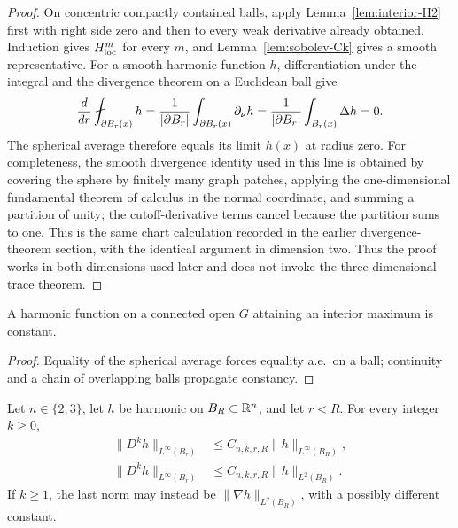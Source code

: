 \begin{proof}
On concentric compactly contained balls, apply
Lemma~\ref{lem:interior-H2} first with right side zero and then to every weak
derivative already obtained.  Induction gives $H^m_{\rm loc}$ for every
$m$, and Lemma~\ref{lem:sobolev-Ck} gives a smooth representative.  For a
smooth harmonic function $h$, differentiation under the integral and the
divergence theorem on a Euclidean ball give
\[
 \frac d{dr}\avg_{\partial B_r(x)}h
 =\frac1{|\partial B_r|}\int_{\partial B_r(x)}\partial_\nu h
 =\frac1{|\partial B_r|}\int_{B_r(x)}\Delta h=0.
\]
The spherical average therefore equals its limit $h(x)$ at radius zero.
For completeness, the smooth divergence identity used in this line is
obtained by covering the sphere by finitely many graph patches, applying the
one-dimensional fundamental theorem of calculus in the normal coordinate,
and summing a partition of unity; the cutoff-derivative terms cancel because
the partition sums to one.  This is the same chart calculation recorded in
the earlier divergence-theorem section, with the identical argument in
dimension two.  Thus the proof works in both dimensions used later and does
not invoke the three-dimensional trace theorem.
\end{proof}

\begin{proposition}\label{prop:strong-max}
A harmonic function on a connected open $G$ attaining an interior maximum is
constant.
\end{proposition}

\begin{proof}
Equality of the spherical average forces equality a.e.\ on a ball;
continuity and a chain of overlapping balls propagate constancy.
\end{proof}

\begin{lemma}\label{lem:harmonic-deriv}
Let $n\in\{2,3\}$, let $h$ be harmonic on $B_R\subset\mathbb R^n$, and let $r<R$.
For every integer $k\ge0$,
\begin{equation}\label{eq:harmonic-deriv}
\begin{aligned}
  \|D^kh\|_{L^\infty(B_r)}
  &\le C_{n,k,r,R}\|h\|_{L^\infty(B_R)},\\
  \|D^kh\|_{L^\infty(B_r)}
  &\le C_{n,k,r,R}\|h\|_{L^2(B_R)} .
\end{aligned}
\end{equation}
If $k\ge1$, the last norm may instead be
$\|\nabla h\|_{L^2(B_R)}$, with a possibly different constant.
\end{lemma}


